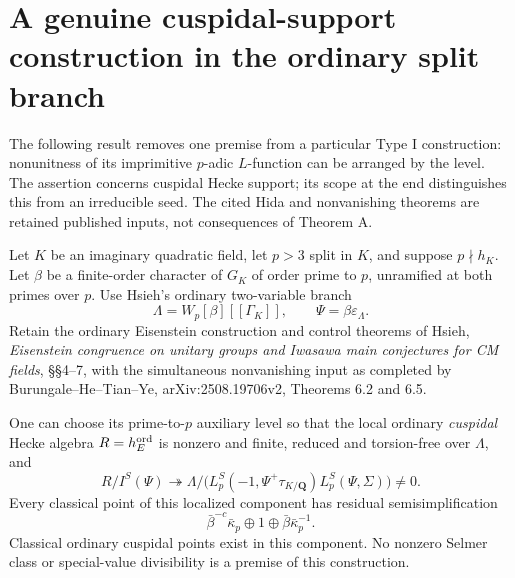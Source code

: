 \section{A genuine cuspidal-support construction in the ordinary split branch}
\label{sec:cubic-hsieh-support}

The following result removes one premise from a particular
Type I construction: nonunitness of its imprimitive
$p$-adic $L$-function can be arranged by the level.
The assertion concerns cuspidal Hecke support; its scope
at the end distinguishes this from an irreducible seed.
The cited Hida and nonvanishing theorems are retained
published inputs, not consequences of Theorem A.

\begin{proposition}
\label{AC-K29-Hsieh-aux}
Let $K$ be an imaginary quadratic field, let $p>3$
split in $K$, and suppose $p\nmid h_K$.
Let $\beta$ be a finite-order character of $G_K$ of
order prime to $p$, unramified at both primes over $p$.
Use Hsieh's ordinary two-variable branch
\[
 \Lambda=W_p[\beta][[\Gamma_K]],\qquad
                 \Psi=\beta\varepsilon_\Lambda .          \tag{HS.1}
\]
Retain the ordinary Eisenstein construction and control
theorems of Hsieh, \emph{Eisenstein congruence on unitary
groups and Iwasawa main conjectures for CM fields},
\S\S4--7, with the simultaneous nonvanishing input
as completed by Burungale--He--Tian--Ye,
arXiv:2508.19706v2, Theorems 6.2 and 6.5.

One can choose its prime-to-$p$ auxiliary level so that
the local ordinary \emph{cuspidal} Hecke algebra
$R=h^{\rm ord}_{E}$ is nonzero and finite,
reduced and torsion-free over $\Lambda$, and
\[
 R/I^{S}(\Psi)\twoheadrightarrow
 \Lambda/\bigl(L_p^{S}(-1,\Psi^+\tau_{K/\mathbf Q})
                         L_p^{S}(\Psi,\Sigma)\bigr)
                  \ne0 .                                  \tag{HS.2}
\]
Every classical point of this localized component has
residual semisimplification
\[
                 \bar\beta^{-c}\bar\kappa_p
                       \oplus1\oplus
                         \bar\beta\bar\kappa_p^{-1}.       \tag{HS.3}
\]
Classical ordinary cuspidal points exist in this component.
No nonzero Selmer class or special-value divisibility
is a premise of this construction.
\end{proposition}
